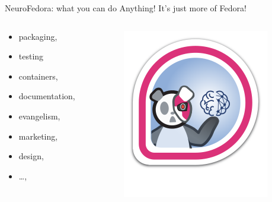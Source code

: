 \begin{frame}[c]{NeuroFedora: what you can do}
  \textcolor{FriendsMagenta}{Anything! It's just more of Fedora!}
  \pause{}
  \begin{columns}
    \begin{column}{0.5\textwidth}
      \begin{itemize}
        \item packaging,
        \item testing
        \item containers,
        \item documentation,
        \item evangelism,
        \item marketing,
        \item design,
        \item \ldots,
      \end{itemize}
    \end{column}
    \begin{column}{0.5\textwidth}
      \begin{figure}[h]
        \centering
        \includegraphics[width=0.8\linewidth]{images/NeuroFedoraBadge.png}
      \end{figure}
    \end{column}
  \end{columns}
\end{frame}
